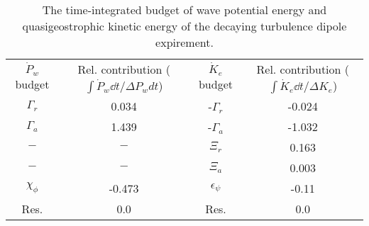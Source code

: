 \begin{table}
\begin{center}
\caption{The time-integrated budget of wave potential energy and quasigeostrophic                kinetic energy of the decaying turbulence dipole expirement. \label{table2}}
\begin{tabular}{cccc}
$\dot{P}_w$ budget & Rel. contribution ($\int\dot{P}_w \dd t/\Delta P_w dt$) & $\dot{K}_e$ budget & Rel. contribution ($\int\dot{K}_e \dd t/\Delta K_e$) \\
$\Gamma_r$ & 0.034 & -$\Gamma_r$ & -0.024 \\
$\Gamma_a$ & 1.439 & -$\Gamma_a$ & -1.032 \\
$-$ & $-$ & $\Xi_r$ & 0.163 \\
$-$ & $-$ & $\Xi_a$ & 0.003 \\
$\chi_\phi$ & -0.473 & $\epsilon_\psi$ & -0.11 \\
Res. & 0.0 & Res. & 0.0 \\
\end{tabular}
\end{center}
\end{table}
